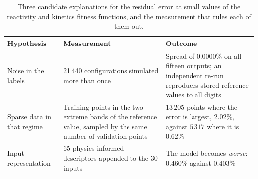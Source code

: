 \begin{table}[htbp]
\centering
\caption{Three candidate explanations for the residual error at small values of
the reactivity and kinetics fitness functions, and the measurement that rules
each of them out.}
\label{tab:hypotheses}
\begin{tabular}{|p{2.9cm}|p{4.55cm}|p{4.55cm}|}
\hline
Hypothesis & Measurement & Outcome \\ \hline
Noise in the labels & 21\,440 configurations simulated more than once &
Spread of $0.0000\%$ on all fifteen outputs; an independent re-run reproduces
stored reference values to all digits \\ \hline
Sparse data in that regime & Training points in the two extreme bands of the
reference value, sampled by the same number of validation points &
$13\,205$ points where the error is largest, $2.02\%$, against $5\,317$ where it is
$0.62\%$ \\ \hline
Input representation & 65 physics-informed descriptors appended to the
30 inputs & The model becomes \emph{worse}: $0.460\%$ against $0.403\%$
\\ \hline
\end{tabular}
\end{table}

